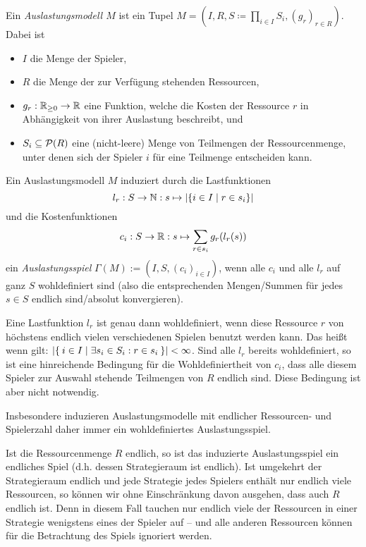 \begin{defn}\label{def:Auslastungsmodel}
	Ein \emph{Auslastungsmodell $M$} ist ein Tupel $M = (I, R, S \coloneqq \prod_{i\in I} S_i, (g_r)_{r \in R})$. Dabei ist
	\begin{itemize}
		\item $I$ die Menge der Spieler,
		\item $R$ die Menge der zur Verfügung stehenden Ressourcen,
		\item $g_r: \mathbb{R}_{\geq 0} \to \mathbb{R}$ eine Funktion, welche die Kosten der Ressource $r$ in Abhängigkeit von ihrer Auslastung beschreibt, und
		\item $S_i \subseteq \mathcal{P}(R)$ eine (nicht-leere) Menge von Teilmengen der Ressourcenmenge, unter denen sich der Spieler $i$ für eine Teilmenge entscheiden kann. 
	\end{itemize}
\end{defn}

\begin{defn}\label{def:Auslastungsspiel}
	Ein Auslastungsmodell $M$ induziert durch die Lastfunktionen
		\[l_r: S \to \mathbb{N}: s \mapsto \left|\{i\in I \mid r \in s_i\}\right|\]
	und die Kostenfunktionen
		\[c_i: S \to \mathbb{R}: s \mapsto \sum_{r \in s_i} g_r(l_r(s)) \]
	ein \emph{Auslastungsspiel} $\Gamma(M) := (I, S, (c_i)_{i \in I})$, wenn alle $c_i$ und alle $l_r$ auf ganz $S$ wohldefiniert sind (also die entsprechenden Mengen/Summen für jedes $s \in S$ endlich sind/absolut konvergieren).
\end{defn}

\begin{bem}\label{bem:AuslSpielWohldefiniertheit}
	Eine Lastfunktion $l_r$ ist genau dann wohldefiniert, wenn diese Ressource $r$ von höchstens endlich vielen verschiedenen Spielen benutzt werden kann. Das heißt wenn gilt: $\left|\Set{i \in I | \exists s_i \in S_i: r \in s_i}\right| < \infty$. Sind alle $l_r$ bereits wohldefiniert, so ist eine hinreichende Bedingung für die Wohldefiniertheit von $c_i$, dass alle diesem Spieler zur Auswahl stehende Teilmengen von $R$ endlich sind. Diese Bedingung ist aber nicht notwendig.
	
	Insbesondere induzieren Auslastungsmodelle mit endlicher Ressourcen- und Spielerzahl daher immer ein wohldefiniertes Auslastungsspiel.
	
	Ist die Ressourcenmenge $R$ endlich, so ist das induzierte Auslastungsspiel ein endliches Spiel (d.h. dessen Strategieraum ist endlich). Ist umgekehrt der Strategieraum endlich und jede Strategie jedes Spielers enthält nur endlich viele Ressourcen, so können wir ohne Einschränkung davon ausgehen, dass auch $R$ endlich ist. Denn in diesem Fall tauchen nur endlich viele der Ressourcen in einer Strategie wenigstens eines der Spieler auf -- und alle anderen Ressourcen können für die Betrachtung des Spiels ignoriert werden.
\end{bem}

